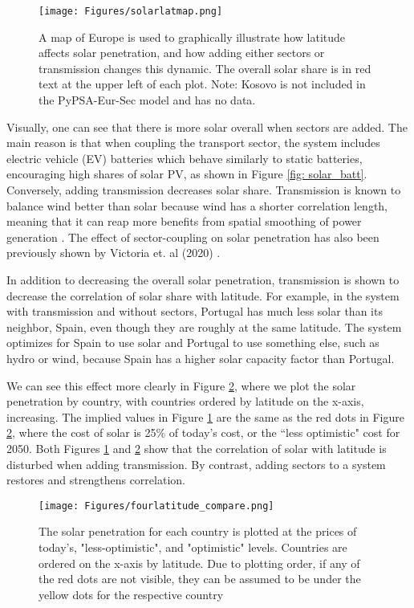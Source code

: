 \documentclass[lettersize,journal]{IEEEtran}
\begin{document}
\begin{figure}[H]
\centering
\texttt{[image: Figures/solarlatmap.png]}

\caption{A map of Europe is used to graphically illustrate how latitude affects solar penetration, and how adding either sectors or transmission changes this dynamic. The overall solar share is in red text at the upper left of each plot. Note: Kosovo is not included in the PyPSA-Eur-Sec model and has no data.} 
\label{fig: europemaplats} 
\end{figure}

Visually, one can see that there is more solar overall when sectors are added. The main reason is that when coupling the transport sector, the system includes electric vehicle (EV) batteries which behave similarly to static batteries, encouraging high shares of solar PV, as shown in Figure \ref{fig: solar_batt}. Conversely, adding transmission decreases solar share. Transmission is known to balance wind better than solar because wind has a shorter correlation length, meaning that it can reap more benefits from spatial smoothing of power generation \cite{victoria_role_2020}. The effect of sector-coupling on solar penetration has also been previously shown by Victoria et. al (2020) \cite{victoria_role_2020}. 



In addition to decreasing the overall solar penetration, transmission is shown to decrease the correlation of solar share with latitude. For example, in the system with transmission and without sectors, Portugal has much less solar than its neighbor, Spain, even though they are roughly at the same latitude. The system optimizes for Spain to use solar and Portugal to use something else, such as hydro or wind, because Spain has a higher solar capacity factor than Portugal.

We can see this effect more clearly in Figure \ref{fig: solar_by_lat}, where we plot the solar penetration by country, with countries ordered by latitude on the x-axis, increasing. The implied values in Figure \ref{fig: europemaplats} are the same as the red dots in Figure \ref{fig: solar_by_lat}, where the cost of solar is 25\% of today’s cost, or the ``less optimistic" cost for 2050. Both Figures \ref{fig: europemaplats} and \ref{fig: solar_by_lat} show that the correlation of solar with latitude is disturbed when adding transmission. By contrast, adding sectors to a system restores and strengthens correlation. 

\begin{figure}[H]
\centering
\texttt{[image: Figures/fourlatitude\_compare.png]}

\caption{The solar penetration for each country is plotted at the prices of today's, "less-optimistic", and "optimistic" levels. Countries are ordered on the x-axis by latitude. Due to plotting order, if any of the red dots are not visible, they can be assumed to be under the yellow dots for the respective country} 
\label{fig: solar_by_lat} 
\end{figure}
\end{document}
